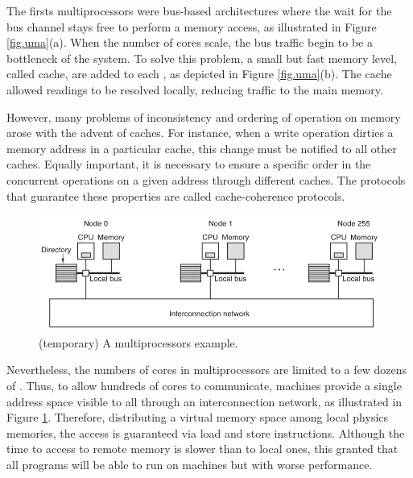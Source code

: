 			The firsts \uma multiprocessors were bus-based architectures where
			the \cpu wait for the bus channel stays free to perform a memory
			access, as illustrated in Figure \ref{fig.uma}(a).
			When the number of cores scale, the bus traffic begin to be a
			bottleneck of the system.
			To solve this problem, a small but fast memory level, called cache,
			are added to each \cpu, as depicted in Figure \ref{fig.uma}(b).
			The cache allowed readings to be resolved locally, reducing traffic
			to the main memory.

			However, many problems of inconsistency and ordering of operation
			on memory arose with the advent of caches.
			For instance, when a write operation dirties a memory address in
			a particular cache, this change must be notified to all other caches.
			Equally important, it is necessary to ensure a specific order in
			the concurrent operations on a given address through different caches.
			The protocols that guarantee these properties are called cache-coherence protocols.

			\begin{figure}[h]
				\centering
				\includegraphics[width=.8\textwidth]{images/numa.png}

				\caption{
					(temporary) A \numa multiprocessors example.
				}\par
				\label{fig.numa}
			\end{figure}

			Nevertheless, the numbers of cores in \uma multiprocessors are limited
			to a few dozens of \cpus.
			Thus, to allow hundreds of cores to communicate, \numa machines provide
			a single address space visible to all \cpus through an interconnection
			network,  as illustrated in Figure \ref{fig.numa}.
			Therefore, distributing a virtual memory space among local physics memories,
			the access is guaranteed via load and store instructions.
			Although the time to access to remote memory is slower than to local ones,
			this granted that all \uma programs will be able to run on \numa machines
			but with worse performance.

